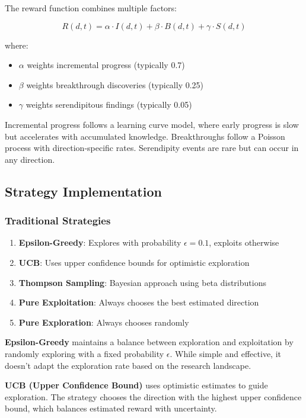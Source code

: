 \documentclass[letterpaper]{article} %
\begin{document}
The reward function combines multiple factors:

\begin{equation}
R(d, t) = \alpha \cdot I(d, t) + \beta \cdot B(d, t) + \gamma \cdot S(d, t)
\end{equation}

where:
\begin{itemize}
\item $\alpha$ weights incremental progress (typically 0.7)
\item $\beta$ weights breakthrough discoveries (typically 0.25)
\item $\gamma$ weights serendipitous findings (typically 0.05)
\end{itemize}

Incremental progress follows a learning curve model, where early progress is slow but accelerates with accumulated knowledge. Breakthroughs follow a Poisson process with direction-specific rates. Serendipity events are rare but can occur in any direction.

\subsection{Strategy Implementation}

\subsubsection{Traditional Strategies}

\begin{enumerate}
\item \textbf{Epsilon-Greedy}: Explores with probability $\epsilon = 0.1$, exploits otherwise
\item \textbf{UCB}: Uses upper confidence bounds for optimistic exploration
\item \textbf{Thompson Sampling}: Bayesian approach using beta distributions
\item \textbf{Pure Exploitation}: Always chooses the best estimated direction
\item \textbf{Pure Exploration}: Always chooses randomly
\end{enumerate}

\textbf{Epsilon-Greedy} maintains a balance between exploration and exploitation by randomly exploring with a fixed probability $\epsilon$. While simple and effective, it doesn't adapt the exploration rate based on the research landscape.

\textbf{UCB (Upper Confidence Bound)} uses optimistic estimates to guide exploration. The strategy chooses the direction with the highest upper confidence bound, which balances estimated reward with uncertainty.
\end{document}
